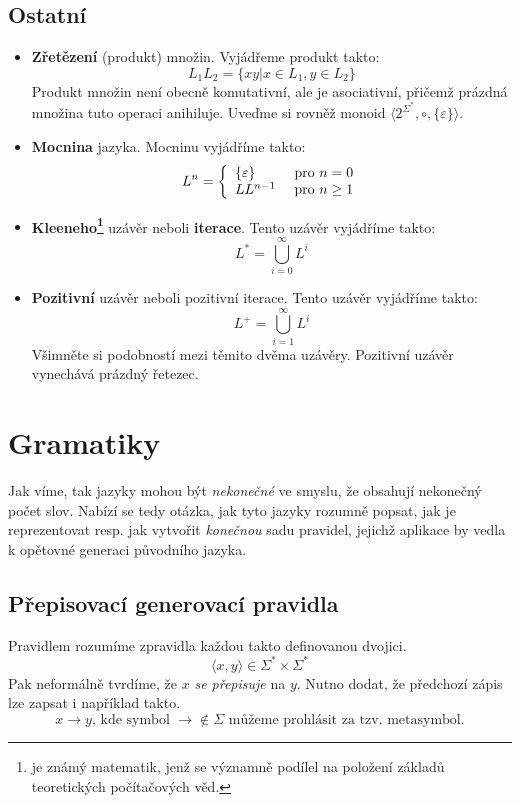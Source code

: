 \documentclass[10pt, a4paper, titlepage]{article}
\theoremstyle{note}
\begin{document}
\subsection{Ostatní}
\begin{itemize}
\item
\textbf{Zřetězení} (produkt) množin. Vyjádřeme produkt takto:
$$
L_{1}L_{2} = \lbrace xy | x \in L_{1}, y \in L_{2} \rbrace
$$
Produkt množin není obecně komutativní, ale je asociativní, přičemž prázdná množina tuto operaci anihiluje.
Uveďme si rovněž monoid $\langle 2^{\Sigma^{*}}, \circ, \lbrace \varepsilon \rbrace \rangle$.

\item
\textbf{Mocnina} jazyka. Mocninu vyjádříme takto:
$$
L^{n} = \left \lbrace
\begin{array}{l l}
\lbrace \varepsilon \rbrace & \text{ pro } n = 0 \\
LL^{n-1} & \text{ pro } n \geq 1 \\
\end{array}
\right.
$$

\item
\textbf{Kleeneho\footnote{ je známý matematik, jenž se významně podílel na položení základů teoretických počítačových věd.}} uzávěr neboli \textbf{iterace}. Tento uzávěr vyjádříme takto:
$$
L^{*} = \bigcup_{i = 0}^{\infty} L^{i}
$$

\item
\textbf{Pozitivní} uzávěr neboli pozitivní iterace. Tento uzávěr vyjádříme takto:
$$
L^{+} = \bigcup_{i = 1}^{\infty} L^{i}
$$
Všimněte si podobností mezi těmito dvěma uzávěry. Pozitivní uzávěr vynechává prázdný řetezec.

\end{itemize}

\section{Gramatiky}
Jak víme, tak jazyky mohou být \emph{nekonečné} ve smyslu, že obsahují nekonečný počet slov.
Nabízí se tedy otázka, jak tyto jazyky rozumně popsat, jak je reprezentovat resp. jak vytvořit \emph{konečnou}
sadu pravidel, jejichž aplikace by vedla k opětovné generaci původního jazyka.

\subsection{Přepisovací generovací pravidla}
Pravidlem rozumíme zpravidla každou takto definovanou dvojici.
$$
\langle x,y \rangle \in \Sigma^{*} \times \Sigma^{*}
$$
Pak neformálně tvrdíme, že $x$ \emph{se přepisuje} na $y$.
Nutno dodat, že předchozí zápis lze zapsat i například takto.
$$
x \rightarrow y\text{, kde symbol } \rightarrow \notin \Sigma \text{ můžeme prohlásit za tzv. metasymbol.}
$$
\end{document}
